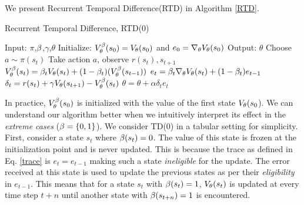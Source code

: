 We present Recurrent Temporal Difference(RTD) in Algorithm \ref{RTD}.
\begin{algorithm}[H]
\caption{Recurrent Temporal Difference, RTD(0)}
\begin{algorithmic}[1]
    \label{RTD}
    \STATE Input: $\pi$,$\beta$,$\gamma$,$\theta$
    \STATE Initialize: $V^{\beta}_{\theta}(s_0) = V_{\theta}(s_0)$ and $e_0 = \nabla_{\theta} V_{\theta}(s_0)$
    \STATE Output: $\theta$
        \STATE Choose $a \sim \pi(s_t)$
        \STATE Take action $a$, observe $r(s_t),s_{t+1}$
        \STATE $V^{\beta}_{\theta}(s_t) = \beta_t V_{\theta}(s_t) + (1-\beta_t) (V^{\beta}_{\theta} (s_{t-1}))$
        \STATE $e_t = \beta_t \nabla_{\theta} V_{\theta}(s_t) + (1-\beta_t) e_{t-1}$
        \STATE $\delta_t = r(s_t) + \gamma V_{\theta}(s_{t+1}) - V^{\beta}_{\theta}(s_t)$
        \STATE $\theta = \theta + \alpha \delta_t e_t $
    \ENDFOR
\end{algorithmic}
\end{algorithm}
In practice, $V^{\beta}_{\theta}(s_0)$ is initialized with the value of the first state $V_{\theta}(s_0$). We can understand our algorithm better when we intuitively interpret its effect in the \emph{extreme cases} ($\beta=\{0,1\}$). We consider TD(0) in a tabular setting for simplicity. First, consider a state $s_t$ where $\beta(s_t) = 0$. The value of this state is frozen at the initialization point and is never updated. This is because the trace as defined in Eq. \eqref{trace} is $e_t = e_{t-1}$ making such a state \emph{ineligible} for the update. The error received at this state is used to update the previous states as per their \emph{eligibility} in $e_{t-1}$. This means that for a state $s_t$ with $\beta(s_t)=1$, $V_{\theta}(s_t)$ is updated at every time step $t+n$ until another state with $\beta(s_{t+n}) = 1$ is encountered.

